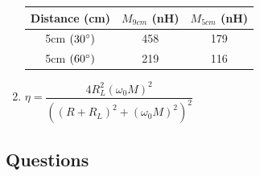 \documentclass{article}
\begin{document}
\begin{enumerate}
	\begin{table}[h]
	\centering
		\begin{tabular}{|c|c|c|}
		\hline
		Distance (cm)	  & $M_{9cm}$ (nH) & $M_{5cm}$ (nH) \\ \hline
		5cm $(30\degree)$ & 458 		   & 179   			\\ \hline
		5cm $(60\degree)$ & 219 		   & 116 		    \\ \hline
		\end{tabular}
	\end{table}

	\item $\eta = \dfrac{4R_L^2(\omega_0M)^2}{((R+R_L)^2+(\omega_0M)^2)^2}$
\end{enumerate}

\subsection{Questions}
\end{document}
